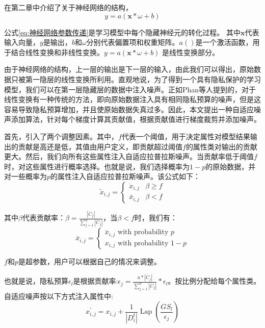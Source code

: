 在第二章中介绍了关于神经网络的结构，
\begin{equation}\label{eq:神经网络参数传递}
y=a(\mathbf{x} * \omega+b)
\end{equation}

公式\ref{eq:神经网络参数传递}是学习模型中每个隐藏神经元的转化过程。
其中$\mathbf{x}$代表输入向量，$y$是输出，$b$和$\omega$分别代表偏置项和权重矩阵。$a()$是一个激活函数，用于结合线性变换和非线性变换。$y=a(\mathbf{x} * \omega+b)$ 是线性变换部分。

由于神经网络的结构，上一层的输出是下一层的输入，由此我们可以得出，原始数据只被第一隐层的线性变换所利用。直观地说，为了得到一个具有隐私保护的学习模型，我们可以在第一层隐藏层的数据中注入噪声。正如Phan等人提到的，对于线性变换有一种传统的方法，即向原始数据注入具有相同隐私预算的噪声，但是这容易导致隐私预算增加，并且使原始数据失真过多。因此，本文提出一种自适应噪声添加算法，针对每个梯度计算其贡献值，根据贡献值进行梯度裁剪并添加噪声。

首先，引入了两个调整因素。其中，$f$代表一个阈值，用于决定属性对模型结果输出的贡献是高还是低，其值由用户定义，即贡献超过阈值$f$的属性类对输出的贡献更大。然后，我们向所有这些属性注入自适应拉普拉斯噪声。当贡献率低于阈值$f$时，对这些属性进行概率选择。也就是说，我们选择概率为$1-p$的原始数据，并对一些概率为$p$的属性注入自适应拉普拉斯噪声。该公式如下：
\begin{equation}\label{eq:神经网络加噪}
\tilde{x}_{i, j}=\left\{\begin{array}{ll}
\ddot{x}_{i, j} & \beta \geq f \\
\bar{x}_{i, j} & \beta<f
\end{array}\right.
\end{equation}

其中$\beta$代表贡献率：$\beta=\frac{\left|\ddot{C}_{j}\right|}{\sum_{j=1}^{u}\left|\ddot{C}_{j}\right|}$，当$\beta<f$时，我们有：
\begin{equation}\label{eq:神经网络加噪2}
\bar{x}_{i, j}=\left\{\begin{array}{l}
\ddot{x}_{i, j} \text { with probability } p \\
x_{i, j} \text { with probability } 1-p
\end{array}\right.
\end{equation}


$f$和$p$是超参数，用户可以根据自己的情况来调整。

也就是说，隐私预算$\epsilon_{l}$是根据贡献率:$\epsilon_{j}=\frac{u *\left|\ddot{C}_{j}\right|}{\sum_{j=1}^{u}\left|\ddot{C}_{j}\right|} * \epsilon_{l}$。按比例分配给每个属性类。自适应噪声按以下方式注入属性中:
\begin{equation}\label{eq:神经网络加噪3}
x_{i, j}^{\prime}=x_{i, j}+\frac{1}{\left|D_{i}^{t}\right|} \operatorname{Lap}\left(\frac{G S_{l}}{\epsilon_{j}}\right)
\end{equation}

